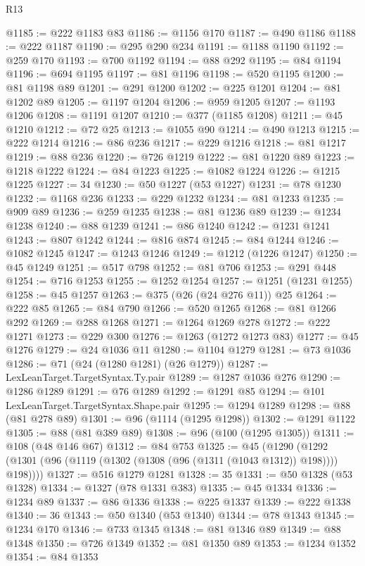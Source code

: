 \begin{lexlean}{R13}
\begin{coremodule}
@1185 := @222 @1183 @83
@1186 := @1156 @170
@1187 := @490 @1186
@1188 := @222 @1187
@1190 := @295 @290 @234
@1191 := @1188 @1190
@1192 := @259 @170
@1193 := @700 @1192
@1194 := @88 @292
@1195 := @84 @1194
@1196 := @694 @1195
@1197 := @81 @1196
@1198 := @520 @1195
@1200 := @81 @1198 @89
@1201 := @291 @1200
@1202 := @225 @1201
@1204 := @81 @1202 @89
@1205 := @1197 @1204
@1206 := @959 @1205
@1207 := @1193 @1206
@1208 := @1191 @1207
@1210 := @377 (@1185 @1208)
@1211 := @45 @1210
@1212 := @72 @25
@1213 := @1055 @90
@1214 := @490 @1213
@1215 := @222 @1214
@1216 := @86 @236
@1217 := @229 @1216
@1218 := @81 @1217
@1219 := @88 @236
@1220 := @726 @1219
@1222 := @81 @1220 @89
@1223 := @1218 @1222
@1224 := @84 @1223
@1225 := @1082 @1224
@1226 := @1215 @1225
@1227 := 34
@1230 := @50 @1227 (@53 @1227)
@1231 := @78 @1230
@1232 := @1168 @236
@1233 := @229 @1232
@1234 := @81 @1233
@1235 := @909 @89
@1236 := @259 @1235
@1238 := @81 @1236 @89
@1239 := @1234 @1238
@1240 := @88 @1239
@1241 := @86 @1240
@1242 := @1231 @1241
@1243 := @807 @1242
@1244 := @816 @874
@1245 := @84 @1244
@1246 := @1082 @1245
@1247 := @1243 @1246
@1249 := @1212 (@1226 @1247)
@1250 := @45 @1249
@1251 := @517 @798
@1252 := @81 @706
@1253 := @291 @448
@1254 := @716 @1253
@1255 := @1252 @1254
@1257 := @1251 (@1231 @1255)
@1258 := @45 @1257
@1263 := @375 (@26 (@24 @276 @11)) @25
@1264 := @222 @85
@1265 := @84 @790
@1266 := @520 @1265
@1268 := @81 @1266 @292
@1269 := @288 @1268
@1271 := @1264 @1269 @278
@1272 := @222 @1271
@1273 := @229 @300
@1276 := @1263 (@1272 @1273 @83)
@1277 := @45 @1276
@1279 := @24 @1036 @11
@1280 := @1104 @1279
@1281 := @73 @1036
@1286 := @71 (@24 (@1280 @1281) (@26 @1279))
@1287 := LexLeanTarget.TargetSyntax.Ty.pair
@1289 := @1287 @1036 @276
@1290 := @1286 @1289
@1291 := @76 @1289
@1292 := @1291 @85
@1294 := @101 LexLeanTarget.TargetSyntax.Shape.pair
@1295 := @1294 @1289
@1298 := @88 (@81 @278 @89)
@1301 := @96 (@1114 (@1295 @1298))
@1302 := @1291 @1122
@1305 := @88 (@81 @389 @89)
@1308 := @96 (@100 (@1295 @1305))
@1311 := @108 (@48 @146 @67)
@1312 := @84 @753
@1325 := @45
    (@1290 (@1292 (@1301 (@96 (@1119 (@1302 (@1308 (@96 (@1311 (@1043 @1312)) @198)))) @198))))
@1327 := @516 @1279 @1281
@1328 := 35
@1331 := @50 @1328 (@53 @1328)
@1334 := @1327 (@78 @1331 @383)
@1335 := @45 @1334
@1336 := @1234 @89
@1337 := @86 @1336
@1338 := @225 @1337
@1339 := @222 @1338
@1340 := 36
@1343 := @50 @1340 (@53 @1340)
@1344 := @78 @1343
@1345 := @1234 @170
@1346 := @733 @1345
@1348 := @81 @1346 @89
@1349 := @88 @1348
@1350 := @726 @1349
@1352 := @81 @1350 @89
@1353 := @1234 @1352
@1354 := @84 @1353

\end{coremodule}
\end{lexlean}
